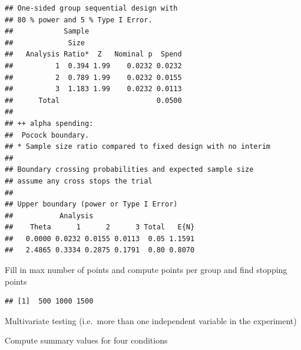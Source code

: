\documentclass[]{book}
\newenvironment{Shaded}{\begin{snugshade}}{\end{snugshade}}
\newcommand{\CommentTok}[1]{\textcolor[rgb]{0.56,0.35,0.01}{\textit{#1}}}
\newcommand{\DataTypeTok}[1]{\textcolor[rgb]{0.13,0.29,0.53}{#1}}
\newcommand{\DecValTok}[1]{\textcolor[rgb]{0.00,0.00,0.81}{#1}}
\newcommand{\KeywordTok}[1]{\textcolor[rgb]{0.13,0.29,0.53}{\textbf{#1}}}
\newcommand{\NormalTok}[1]{#1}
\newcommand{\OperatorTok}[1]{\textcolor[rgb]{0.81,0.36,0.00}{\textbf{#1}}}
\newcommand{\StringTok}[1]{\textcolor[rgb]{0.31,0.60,0.02}{#1}}
\begin{document}
\begin{verbatim}
## One-sided group sequential design with
## 80 % power and 5 % Type I Error.
##            Sample
##             Size 
##   Analysis Ratio*  Z   Nominal p  Spend
##          1  0.394 1.99    0.0232 0.0232
##          2  0.789 1.99    0.0232 0.0155
##          3  1.183 1.99    0.0232 0.0113
##      Total                       0.0500 
## 
## ++ alpha spending:
##  Pocock boundary.
## * Sample size ratio compared to fixed design with no interim
## 
## Boundary crossing probabilities and expected sample size
## assume any cross stops the trial
## 
## Upper boundary (power or Type I Error)
##           Analysis
##    Theta      1      2      3 Total   E{N}
##   0.0000 0.0232 0.0155 0.0113  0.05 1.1591
##   2.4865 0.3334 0.2875 0.1791  0.80 0.8070
\end{verbatim}

Fill in max number of points and compute points per group and find stopping points

\begin{Shaded}
\end{Shaded}

\begin{verbatim}
## [1]  500 1000 1500
\end{verbatim}

Multivariate testing (i.e.~more than one independent variable in the experiment)

Compute summary values for four conditions

\begin{Shaded}
\end{Shaded}
\end{document}
